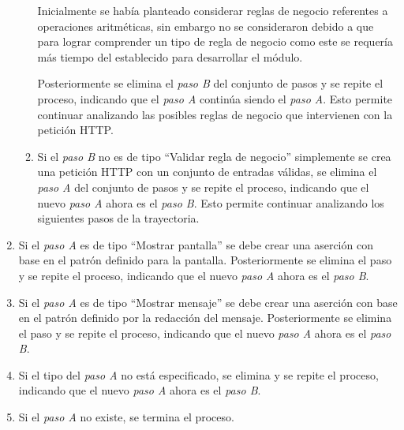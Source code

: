 \begin{enumerate}
\begin{enumerate}
			Inicialmente se había planteado considerar reglas de negocio referentes a operaciones aritméticas, sin embargo no se consideraron debido a que para lograr comprender un tipo de regla de negocio como este se requería más tiempo del establecido para desarrollar el módulo.
			
			
			Posteriormente se elimina el {\it paso B} del conjunto de pasos y se repite el proceso, indicando que el {\it paso A} continúa siendo el {\it paso A}. Esto permite continuar analizando las posibles reglas de negocio que intervienen con la petición HTTP.\\
						
			
			\item Si el {\it paso B} no es de tipo ``Validar regla de negocio'' simplemente se crea una petición HTTP con un conjunto de entradas válidas, se elimina el {\it paso A} del conjunto de pasos y se repite el proceso, indicando que el nuevo {\it paso A} ahora es el {\it paso B}. Esto permite continuar analizando los siguientes pasos de la trayectoria.
			
		\end{enumerate}
		 
			\item Si el {\it paso A} es de tipo ``Mostrar pantalla'' se debe crear una aserción con base en el patrón definido para la pantalla. Posteriormente se elimina el paso y se repite el proceso, indicando que el nuevo {\it paso A} ahora es el {\it paso B}.
			
			\item Si el {\it paso A} es de tipo ``Mostrar mensaje'' se debe crear una aserción con base en el patrón definido por la redacción del mensaje. Posteriormente se elimina el paso y se repite el proceso, indicando que el nuevo {\it paso A} ahora es el {\it paso B}.
			
			\item Si el tipo del {\it paso A} no está especificado, se elimina y se repite el proceso, indicando que el nuevo {\it paso A} ahora es el {\it paso B}.
			
			\item Si el {\it paso A} no existe, se termina el proceso.
	\end{enumerate}